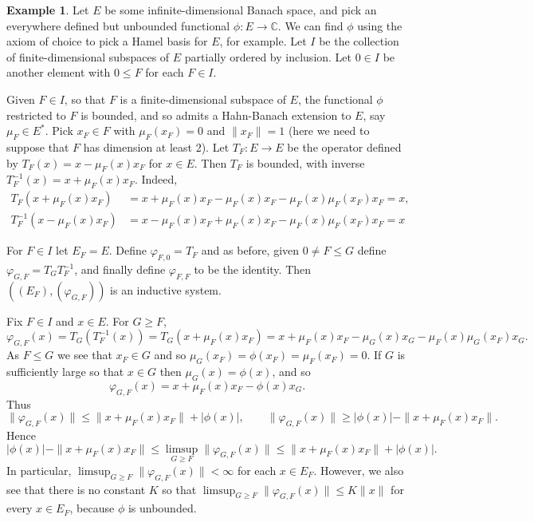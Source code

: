 \documentclass[a4paper,11pt]{article}
\theoremstyle{definition}
\newtheorem{example}[lemma]{Example}
\begin{document}
\begin{example}\label{ex:2}
Let $E$ be some infinite-dimensional Banach space, and pick an everywhere defined but unbounded
functional $\phi:E\rightarrow\mathbb{C}$.  We can find $\phi$ using the axiom of choice to pick a
Hamel basis for $E$, for example.  Let $I$ be the collection of finite-dimensional subspaces of $E$
partially ordered by inclusion.  Let $0\in I$ be another element with $0\leq F$ for each $F\in I$.

Given $F\in I$, so that $F$ is a finite-dimensional subspace of $E$, the functional $\phi$
restricted to $F$ is bounded, and so admits a Hahn-Banach extension to $E$, say $\mu_F\in E^*$.
Pick $x_F\in F$ with $\mu_F(x_F)=0$ and $\|x_F\|=1$ (here we need to suppose that $F$ has dimension
at least 2).  Let $T_F:E\rightarrow E$ be the operator defined by $T_F(x) = x - \mu_F(x) x_F$ for
$x\in E$.  Then $T_F$ is bounded, with inverse $T_F^{-1}(x) = x + \mu_F(x)x_F$.  Indeed,
\begin{align*}
T_F( x + \mu_F(x)x_F ) &= x + \mu_F(x)x_F - \mu_F(x)x_F - \mu_F(x)\mu_F(x_F) x_F = x, \\
T_F^{-1}( x - \mu_F(x) x_F ) &= x - \mu_F(x) x_F + \mu_F(x)x_F - \mu_F(x) \mu_F(x_F)x_F = x
\end{align*}

For $F\in I$ let $E_F=E$.
Define $\varphi_{F,0} = T_F$ and as before, given $0\not=F \leq G$ define $\varphi_{G,F}
= T_G T_F^{-1}$, and finally define $\varphi_{F,F}$ to be the identity.  Then
$((E_F),(\varphi_{G,F}))$ is an inductive system.

Fix $F\in I$ and $x\in E$.  For $G\geq F$,
\[ \varphi_{G,F}(x) = T_G( T_F^{-1}(x) ) = T_G( x + \mu_F(x)x_F )
= x + \mu_F(x)x_F - \mu_G(x)x_G - \mu_F(x)\mu_G(x_F)x_G. \]
As $F\leq G$ we see that $x_F\in G$ and so $\mu_G(x_F) = \phi(x_F) = \mu_F(x_F) = 0$.
If $G$ is sufficiently large so that $x\in G$ then $\mu_G(x) = \phi(x)$, and so
\[ \varphi_{G,F}(x) = x + \mu_F(x)x_F - \phi(x)x_G. \]
Thus
\[ \|\varphi_{G,F}(x)\| \leq \|x + \mu_F(x)x_F\| + |\phi(x)|, \qquad
\|\varphi_{G,F}(x)\| \geq |\phi(x)| - \|x + \mu_F(x)x_F\|. \]
Hence
\[ |\phi(x)| - \|x + \mu_F(x)x_F\| \leq
\limsup_{G\geq F} \|\varphi_{G,F}(x)\| \leq
\|x + \mu_F(x)x_F\| + |\phi(x)|. \]
In particular, $\limsup_{G\geq F} \|\varphi_{G,F}(x)\| < \infty$ for each $x\in E_F$.
However, we also see that there is no constant $K$ so that $\limsup_{G\geq F} \|\varphi_{G,F}(x)\|
\leq K \|x\|$ for every $x\in E_F$, because $\phi$ is unbounded.
\end{example}
\end{document}
